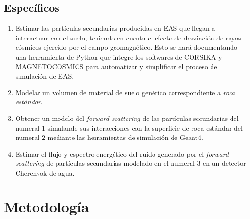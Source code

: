 \documentclass[12pt]{report}
\begin{document}
\subsection*{Específicos}
\begin{enumerate}
    \item Estimar las partículas secundarias producidas en EAS que llegan a interactuar con el suelo, teniendo en cuenta el efecto de desviación de rayos cósmicos ejercido por el campo geomagnético. Esto se hará documentando una herramienta de Python que integre los softwares de CORSIKA y MAGNETOCOSMICS para automatizar y simplificar el proceso de simulación de EAS.
    \item Modelar un volumen de material de suelo genérico correspondiente a \textit{roca estándar}.
    \item Obtener un modelo del \textit{forward scattering} de las partículas secundarias del numeral 1 simulando sus interacciones con la superficie de roca estándar del numeral 2 mediante las herramientas de simulación de Geant4.
    \item Estimar el flujo y espectro energético del ruido generado por el \textit{forward scattering} de partículas secundarias modelado en el numeral 3 en un detector Cherenvok de agua.
\end{enumerate}

\section*{Metodología}
\end{document}
